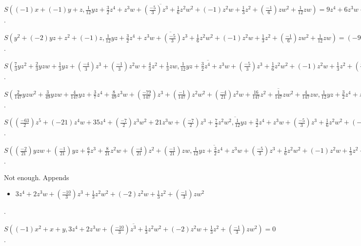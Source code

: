\documentclass{jsarticle}
\begin{document}
$\overline{S((-1)x+(-1)y+z, \frac{1}{12}yz+\frac{3}{2}z^{4}+z^{3}w+(\frac{-5}{3})z^{3}+\frac{1}{6}z^{2}w^{2}+(-1)z^{2}w+\frac{1}{3}z^{2}+(\frac{-1}{6})zw^{2}+\frac{1}{12}zw)} = 9z^{4}+6z^{3}w+(-10)z^{3}+z^{2}w^{2}+(-6)z^{2}w+z^{2}+(-1)zw^{2}$.  

$\overline{S(y^{2}+(-2)yz+z^{2}+(-1)z, \frac{1}{12}yz+\frac{3}{2}z^{4}+z^{3}w+(\frac{-5}{3})z^{3}+\frac{1}{6}z^{2}w^{2}+(-1)z^{2}w+\frac{1}{3}z^{2}+(\frac{-1}{6})zw^{2}+\frac{1}{12}zw)} = (-9)z^{4}+(-6)z^{3}w+10z^{3}+(-1)z^{2}w^{2}+6z^{2}w+(-1)z^{2}+zw^{2}$.  

$\overline{S(\frac{7}{3}yz^{2}+\frac{2}{3}yzw+\frac{1}{3}yz+(\frac{-4}{3})z^{3}+(\frac{-1}{3})z^{2}w+\frac{4}{3}z^{2}+\frac{1}{3}zw, \frac{1}{12}yz+\frac{3}{2}z^{4}+z^{3}w+(\frac{-5}{3})z^{3}+\frac{1}{6}z^{2}w^{2}+(-1)z^{2}w+\frac{1}{3}z^{2}+(\frac{-1}{6})zw^{2}+\frac{1}{12}zw)} = 0$.  

$\overline{S(\frac{2}{147}yzw^{2}+\frac{3}{49}yzw+\frac{4}{147}yz+\frac{3}{7}z^{4}+\frac{8}{49}z^{3}w+(\frac{-79}{147})z^{3}+(\frac{-1}{147})z^{2}w^{2}+(\frac{-4}{21})z^{2}w+\frac{16}{147}z^{2}+\frac{1}{147}zw^{2}+\frac{4}{147}zw, \frac{1}{12}yz+\frac{3}{2}z^{4}+z^{3}w+(\frac{-5}{3})z^{3}+\frac{1}{6}z^{2}w^{2}+(-1)z^{2}w+\frac{1}{3}z^{2}+(\frac{-1}{6})zw^{2}+\frac{1}{12}zw)} = (-18)z^{4}w^{2}+36z^{4}+(-12)z^{3}w^{3}+20z^{3}w^{2}+15z^{3}w+(-4)z^{3}+(-2)z^{2}w^{4}+12z^{2}w^{3}+(-4)z^{2}w^{2}+z^{2}w+2zw^{4}+(-1)zw^{3}$.  

$\overline{S((\frac{-63}{2})z^{5}+(-21)z^{4}w+35z^{4}+(\frac{-7}{2})z^{3}w^{2}+21z^{3}w+(\frac{-7}{2})z^{3}+\frac{7}{2}z^{2}w^{2}, \frac{1}{12}yz+\frac{3}{2}z^{4}+z^{3}w+(\frac{-5}{3})z^{3}+\frac{1}{6}z^{2}w^{2}+(-1)z^{2}w+\frac{1}{3}z^{2}+(\frac{-1}{6})zw^{2}+\frac{1}{12}zw)} = 0$.  

$\overline{S((\frac{-2}{21})yzw+(\frac{-1}{21})yz+\frac{6}{7}z^{3}+\frac{8}{21}z^{2}w+(\frac{-4}{21})z^{2}+(\frac{-1}{21})zw, \frac{1}{12}yz+\frac{3}{2}z^{4}+z^{3}w+(\frac{-5}{3})z^{3}+\frac{1}{6}z^{2}w^{2}+(-1)z^{2}w+\frac{1}{3}z^{2}+(\frac{-1}{6})zw^{2}+\frac{1}{12}zw)} = (-18)z^{4}w+(-9)z^{4}+(-12)z^{3}w^{2}+14z^{3}w+z^{3}+(-2)z^{2}w^{3}+11z^{2}w^{2}+(-2)z^{2}w+2zw^{3}$.  

Not enough.  Appends \begin{itemize}
\item $3z^{4}+2z^{3}w+(\frac{-10}{3})z^{3}+\frac{1}{3}z^{2}w^{2}+(-2)z^{2}w+\frac{1}{3}z^{2}+(\frac{-1}{3})zw^{2}$
\end{itemize}  . 


$\overline{S((-1)x^{2}+x+y, 3z^{4}+2z^{3}w+(\frac{-10}{3})z^{3}+\frac{1}{3}z^{2}w^{2}+(-2)z^{2}w+\frac{1}{3}z^{2}+(\frac{-1}{3})zw^{2})} = 0$.  
\end{document}
